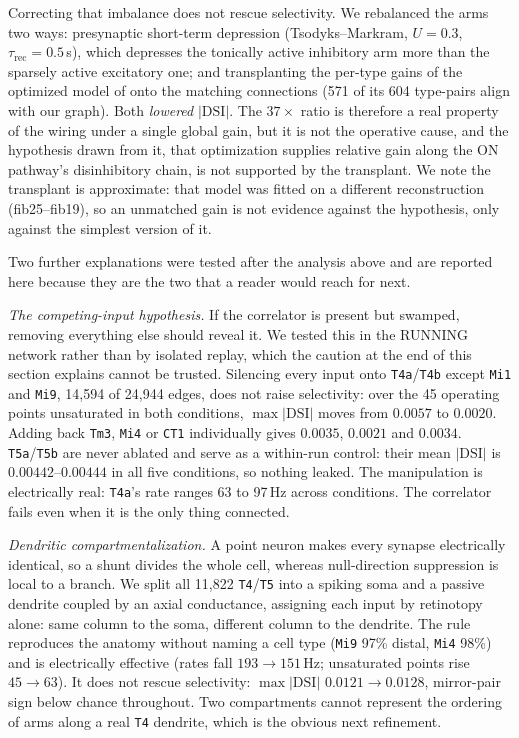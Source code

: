 \documentclass[10pt,twoside]{article}
\newcommand{\cell}[1]{\texttt{#1}}
\begin{document}
Correcting that imbalance does not rescue selectivity. We rebalanced the arms
two ways: presynaptic short-term depression (Tsodyks--Markram, $U=0.3$,
$\tau_{\mathrm{rec}}=0.5$\,s), which depresses the tonically active inhibitory
arm more than the sparsely active excitatory one; and transplanting the
per-type gains of the optimized model of \citet{lappalainen2024} onto the
matching connections (571 of its 604 type-pairs align with our graph). Both
\emph{lowered} $|\mathrm{DSI}|$. The $37\times$ ratio is therefore a real
property of the wiring under a single global gain, but it is not the operative
cause, and the hypothesis drawn from it, that optimization
supplies relative gain along the ON pathway's disinhibitory chain, is not
supported by the transplant. We note the transplant is approximate: that model
was fitted on a different reconstruction (fib25--fib19), so an unmatched gain
is not evidence against the hypothesis, only against the simplest version of
it.

Two further explanations were tested after the analysis above and are
reported here because they are the two that a reader would reach for next.

\emph{The competing-input hypothesis.} If the correlator is present but
swamped, removing everything else should reveal it. We tested this in the
RUNNING network rather than by isolated replay, which the caution at the end of
this section explains cannot be trusted. Silencing every input onto
\cell{T4a}/\cell{T4b} except \cell{Mi1} and \cell{Mi9}, 14{,}594 of
24{,}944 edges, does not raise selectivity: over the 45 operating points
unsaturated in both conditions, $\max|\mathrm{DSI}|$ moves from $0.0057$ to
$0.0020$. Adding back \cell{Tm3}, \cell{Mi4} or \cell{CT1} individually gives
$0.0035$, $0.0021$ and $0.0034$. \cell{T5a}/\cell{T5b} are never ablated and
serve as a within-run control: their mean $|\mathrm{DSI}|$ is
$0.00442$--$0.00444$ in all five conditions, so nothing leaked. The
manipulation is electrically real: \cell{T4a}'s rate ranges 63 to 97\,Hz
across conditions. The correlator fails even when it is the only thing
connected.

\emph{Dendritic compartmentalization.} A point neuron makes every synapse
electrically identical, so a shunt divides the whole cell, whereas
null-direction suppression is local to a branch. We split all 11{,}822
\cell{T4}/\cell{T5} into a spiking soma and a passive dendrite coupled by an
axial conductance, assigning each input by retinotopy alone: same column to
the soma, different column to the dendrite. The rule reproduces the anatomy
without naming a cell type (\cell{Mi9} 97\% distal, \cell{Mi4} 98\%) and is
electrically effective (rates fall $193\to151$\,Hz; unsaturated points rise
$45\to63$). It does not rescue selectivity: $\max|\mathrm{DSI}|$
$0.0121\to0.0128$, mirror-pair sign below chance throughout. Two compartments
cannot represent the ordering of arms along a real \cell{T4} dendrite, which
is the obvious next refinement.
\end{document}

